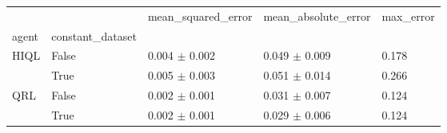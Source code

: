\begin{tabular}{lllll}
\toprule
 &  & mean_squared_error & mean_absolute_error & max_error \\
agent & constant_dataset &  &  &  \\
\midrule
\multirow[t]{2}{*}{HIQL} & False & 0.004 $\pm$ 0.002 & 0.049 $\pm$ 0.009 & 0.178 \\
 & True & 0.005 $\pm$ 0.003 & 0.051 $\pm$ 0.014 & 0.266 \\
\cline{1-5}
\multirow[t]{2}{*}{QRL} & False & 0.002 $\pm$ 0.001 & 0.031 $\pm$ 0.007 & 0.124 \\
 & True & 0.002 $\pm$ 0.001 & 0.029 $\pm$ 0.006 & 0.124 \\
\cline{1-5}
\bottomrule
\end{tabular}
